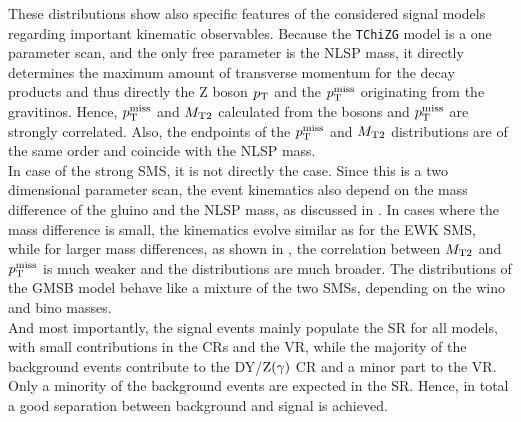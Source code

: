 These distributions show also specific features of the considered signal models regarding important kinematic observables. Because the \texttt{TChiZG} model is a one parameter scan, and the only free parameter is the NLSP mass, it directly determines the maximum amount of transverse momentum for the decay products and thus directly the Z boson $p_{\mathrm{T}}$ and the $p_{\mathrm{T}}^\text{miss}$ originating from the gravitinos. Hence, $p_{\mathrm{T}}^\text{miss}$ and $M_{\mathrm{T2}}$ calculated from the bosons and $p_{\mathrm{T}}^\text{miss}$ are strongly correlated. Also, the endpoints of the $p_{\mathrm{T}}^\text{miss}$ and $M_{\mathrm{T2}}$ distributions are of the same order and coincide with the NLSP mass.\\
In case of the strong SMS, it is not directly the case. Since this is a two dimensional parameter scan, the event kinematics also depend on the mass difference of the gluino and the NLSP mass, as discussed in . In cases where the mass difference is small, the kinematics evolve similar as for the EWK SMS, while for larger mass differences, as shown in , the correlation between $M_{\mathrm{T2}}$ and $p_{\mathrm{T}}^\text{miss}$ is much weaker and the distributions are much broader. The distributions of the GMSB model behave like a mixture of the two SMSs, depending on the wino and bino masses.\\
And most importantly, the signal events mainly populate the SR for all models, with small contributions in the CRs and the VR, while the majority of the background events contribute to the DY/$\mathrm{Z}(\gamma)$ CR and a minor part to the VR. Only a minority of the background events are expected in the SR. Hence, in total a good separation between background and signal is achieved.

